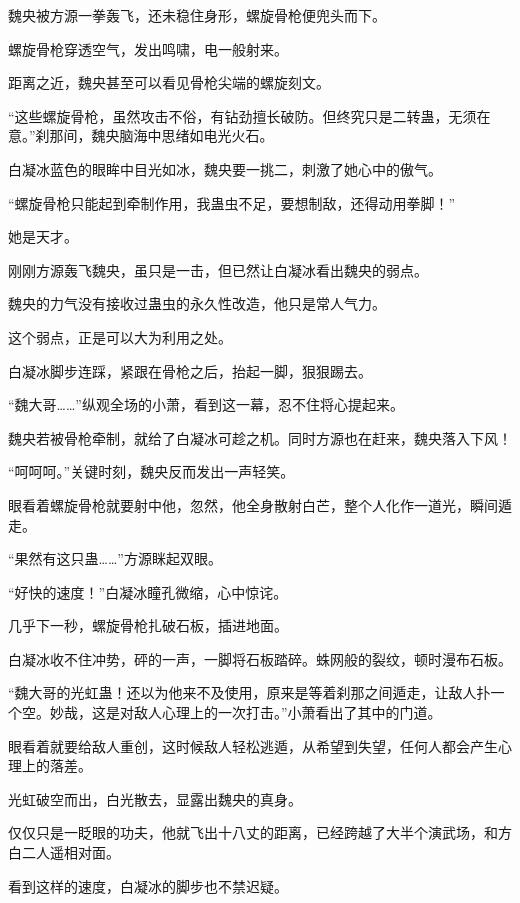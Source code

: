 
\begin{this_body}

魏央被方源一拳轰飞，还未稳住身形，螺旋骨枪便兜头而下。

螺旋骨枪穿透空气，发出鸣啸，电一般射来。

距离之近，魏央甚至可以看见骨枪尖端的螺旋刻文。

“这些螺旋骨枪，虽然攻击不俗，有钻劲擅长破防。但终究只是二转蛊，无须在意。”刹那间，魏央脑海中思绪如电光火石。

白凝冰蓝色的眼眸中目光如冰，魏央要一挑二，刺激了她心中的傲气。

“螺旋骨枪只能起到牵制作用，我蛊虫不足，要想制敌，还得动用拳脚！”

她是天才。

刚刚方源轰飞魏央，虽只是一击，但已然让白凝冰看出魏央的弱点。

魏央的力气没有接收过蛊虫的永久性改造，他只是常人气力。

这个弱点，正是可以大为利用之处。

白凝冰脚步连踩，紧跟在骨枪之后，抬起一脚，狠狠踢去。

“魏大哥……”纵观全场的小萧，看到这一幕，忍不住将心提起来。

魏央若被骨枪牵制，就给了白凝冰可趁之机。同时方源也在赶来，魏央落入下风！

“呵呵呵。”关键时刻，魏央反而发出一声轻笑。

眼看着螺旋骨枪就要射中他，忽然，他全身散射白芒，整个人化作一道光，瞬间遁走。

“果然有这只蛊……”方源眯起双眼。

“好快的速度！”白凝冰瞳孔微缩，心中惊诧。

几乎下一秒，螺旋骨枪扎破石板，插进地面。

白凝冰收不住冲势，砰的一声，一脚将石板踏碎。蛛网般的裂纹，顿时漫布石板。

“魏大哥的光虹蛊！还以为他来不及使用，原来是等着刹那之间遁走，让敌人扑一个空。妙哉，这是对敌人心理上的一次打击。”小萧看出了其中的门道。

眼看着就要给敌人重创，这时候敌人轻松逃遁，从希望到失望，任何人都会产生心理上的落差。

光虹破空而出，白光散去，显露出魏央的真身。

仅仅只是一眨眼的功夫，他就飞出十八丈的距离，已经跨越了大半个演武场，和方白二人遥相对面。

看到这样的速度，白凝冰的脚步也不禁迟疑。


\end{this_body}
